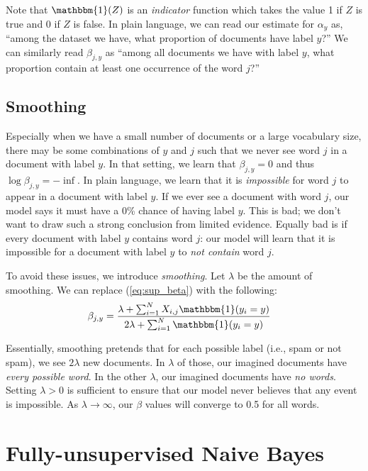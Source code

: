\documentclass[12pt]{article}
\begin{document}
Note that $\mathbbm{1}(Z)$ is an {\it indicator} function which takes the value
1 if $Z$ is true and 0 if $Z$ is false. In plain language, we can read our
estimate for $\alpha_y$ as, ``among the dataset we have, what proportion of
documents have label $y$?'' We can similarly read $\beta_{j, y}$ as ``among all
documents we have with label $y$, what proportion contain at least one
occurrence of the word $j$?''

\subsection{Smoothing}

Especially when we have a small number of documents or a large vocabulary size,
there may be some combinations of $y$ and $j$ such that we never see word $j$
in a document with label $y$. In that setting, we learn that $\beta_{j, y} = 0$
and thus $\log \beta_{j, y} = -\inf$. In plain language, we learn that it is
\emph{impossible} for word $j$ to appear in a document with label $y$. If we
ever see a document with word $j$, our model says it must have a 0\% chance of
having label $y$. This is bad; we don't want to draw such a strong conclusion
from limited evidence. Equally bad is if every document with label $y$ contains
word $j$: our model will learn that it is impossible for a document with
label $y$ to \emph{not contain} word $j$.

To avoid these issues, we introduce \emph{smoothing}. Let
$\lambda$ be the amount of smoothing. We can replace (\ref{eq:sup_beta}) with the following:
\begin{align}
\beta_{j, y} &= \dfrac{\lambda + \sum_{i=1}^N X_{i, j} \mathbbm{1}(y_i =
y)}{2\lambda + \sum_{i=1}^N \mathbbm{1}(y_i = y)}\label{eq:sup_beta_smooth}
\end{align}

Essentially, smoothing pretends that for each possible label (i.e., spam or not
spam), we see $2\lambda$ new documents. In $\lambda$ of those, our imagined
documents have \emph{every possible word}.  In the other $\lambda$, our
imagined documents have \emph{no words}. Setting $\lambda > 0$ is sufficient to
ensure that our model never believes that any event is impossible. As $\lambda
\to \infty$, our $\beta$ values will converge to 0.5 for all words.


\section{Fully-unsupervised Naive Bayes}
\end{document}
